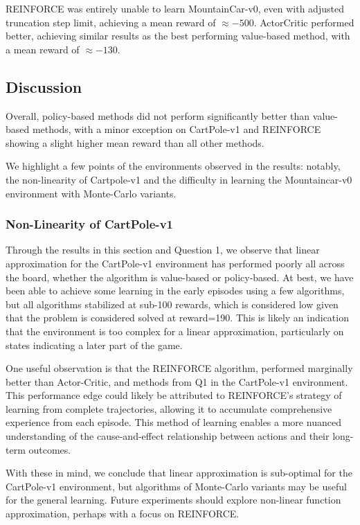 \documentclass{article}
\begin{document}
REINFORCE was entirely unable to learn MountainCar-v0, even with adjusted truncation step limit,
achieving a mean reward of $\approx -500$. ActorCritic performed better, achieving similar
results as the best performing value-based method, with a mean reward of $\approx -130$.

\subsection{Discussion}
Overall, policy-based methods did not perform significantly better than value-based methods,
with a minor exception on CartPole-v1 and REINFORCE showing a slight higher mean reward than
all other methods.

We highlight a few points of the environments observed in the results: notably, the non-linearity of
Cartpole-v1 and the difficulty in learning the Mountaincar-v0 environment with Monte-Carlo variants.

\subsubsection{Non-Linearity of CartPole-v1}

Through the results in this section and Question 1, we observe that linear approximation
for the CartPole-v1 environment has performed poorly all across the board, whether the algorithm
is value-based or policy-based. At best, we have been
able to achieve some learning in the early episodes using a few algorithms, but all algorithms
stabilized at sub-100 rewards, which is considered low given that the problem is considered solved at reward=190\cite{gym}.
This is likely an indication that the environment is too complex for a linear
approximation, particularly on states indicating a later part of the game.

One useful observation is that the REINFORCE algorithm, performed marginally better
than Actor-Critic, and methods from Q1 in the CartPole-v1 environment.
This performance edge could likely be attributed to REINFORCE's strategy of learning from complete trajectories,
allowing it to accumulate comprehensive experience from each episode.
This method of learning enables a more nuanced understanding of the cause-and-effect
relationship between actions and their long-term outcomes.

With these in mind, we conclude that linear approximation is sub-optimal
for the CartPole-v1 environment, but algorithms of Monte-Carlo variants may be useful for the general learning.
Future experiments should explore non-linear function approximation, perhaps with a focus on REINFORCE.
\end{document}
